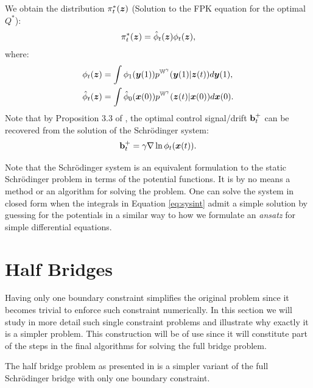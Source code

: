 \documentclass[a4paper,12pt,twoside,openright]{report}
\theoremstyle{definition}
\begin{document}
We obtain the distribution $\pi^{*}_t({\bm{z}})$ (Solution to the FPK equation for the optimal $Q^{*}$):
\begin{align}
    \pi^{*}_t({\bm{z}}) =  {\hat{\phi}}_t({\bm{z}}) \phi_t({\bm{z}}) ,
\end{align}
where:
\begin{align}
    \phi_t({\bm{z}}) &= \int \phi_1({\bm{y}}(1) ) p^{\mathbb{W}^{\gamma}}({\bm{y}}(1)|{\bm{z}}(t)) d{\bm{y}}(1), \nonumber\\ 
    {\hat{\phi}}_t({\bm{z}}) &= \int {\hat{\phi}}_0({\bm{x}}(0)) p^{\mathbb{W}^{\gamma}}({\bm{z}}(t)|{\bm{x}}(0)) d{\bm{x}}(0). \nonumber
\end{align}
Note that by Proposition 3.3 of \cite{pavon1991free}, the optimal control signal/drift ${\mathbf{b}}_t^+$ can be recovered from the solution of the Schrödinger system:
\begin{align} \label{eq:drifr_potential}
    {\mathbf{b}}_t^{+} = \gamma \nabla \ln \phi_t({\bm{x}}(t) ).
\end{align}

Note that the Schrödinger system is an equivalent formulation to the static Schrödinger problem in terms of the potential functions. It is by no means a method or an algorithm for solving the problem. One can solve the system in closed form when the integrals in Equation \ref{eq:sysint} admit a simple solution by guessing for the potentials in a similar way to how we formulate an \textit{ansatz} for simple differential equations. 

\section{Half Bridges}

Having only one boundary constraint simplifies the original problem since it becomes trivial to enforce such constraint numerically. In this section we will study in more detail such single constraint problems and illustrate why exactly it is a simpler problem. This construction will be of use since it will constitute part of the steps in the final algorithms for solving the full bridge problem.

The half bridge problem as presented in \cite{pavon2018data} is a simpler variant of the full Schrödinger bridge with only one boundary constraint. 
\end{document}
